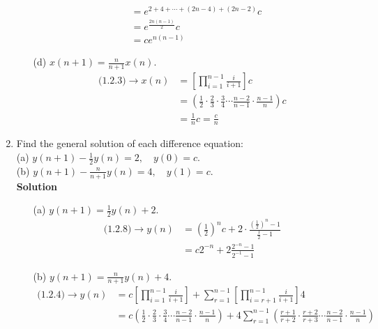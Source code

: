 \begin{enumerate}
\begin{itemize}
\begin{align*}
                                           & =e^{2+4+\cdots+(2n-4)+(2n-2)}c \\
                                           & =e^{\frac{2n(n-1)}{2}}c \\
                                           & =ce^{n(n-1)}
                \end{align*}
            \item[(d)] $x(n+1)=\frac{n}{n+1}x(n).$
                \begin{align*}
                    \text{(1.2.3)}\to x(n) & =\left[\prod_{i=1}^{n-1}\frac{i}{i+1}\right]c \\
                                           & =\left(\frac{1}{2}\cdot\frac{2}{3}\cdot\frac{3}{4}\cdots\frac{n-2}{n-1}\cdot\frac{n-1}{n}\right)c \\
                                           & =\frac{1}{n}c=\frac{c}{n}
                \end{align*}
        \end{itemize}
    \item Find the general solution of each difference equation: \\
        (a) $y(n+1)-\frac{1}{2}y(n)=2,\quad y(0)=c.$  \\
        (b) $y(n+1)-\frac{n}{n+1}y(n)=4,\quad y(1)=c.$ \\
        \textbf{Solution}
        \begin{itemize}
            \item[(a)] $y(n+1)=\frac{1}{2}y(n)+2.$
                \begin{align*}
                    \text{(1.2.8)}\to y(n) & =\left(\frac{1}{2}\right)^n c+2\cdot\frac{(\frac{1}{2})^n -1}{\frac{1}{2}-1} \\
                                           & =c2^{-n}+2\frac{2^{-n}-1}{2^{-1}-1}
                \end{align*}
            \item[(b)] $y(n+1)=\frac{n}{n+1}y(n)+4.$
                \begin{align*}
                    \text{(1.2.4)}\to y(n) & =c\left[\prod_{i=1}^{n-1}\frac{i}{i+1}\right]+\sum_{r=1}^{n-1}\left[\prod_{i=r+1}^{n-1}\frac{i}{i+1}\right]4 \\
                                           & =c\left(\frac{1}{2}\cdot\frac{2}{3}\cdot\frac{3}{4}\cdots\frac{n-2}{n-1}\cdot\frac{n-1}{n}\right)+4\sum_{r=1}^{n-1}\left(\frac{r+1}{r+2}\cdot\frac{r+2}{r+3}\cdots\frac{n-2}{n-1}\cdot\frac{n-1}{n}\right) \\

\end{align*}
\end{itemize}
\end{enumerate}
